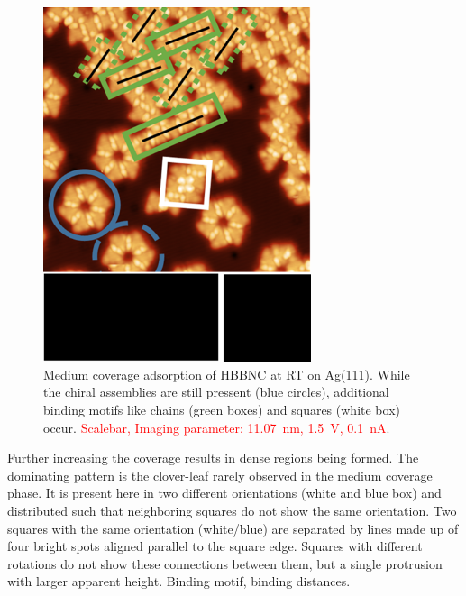 \begin{figure}[] \centering
	\includegraphics[width=0.7\textwidth]{./images/hbbnc-ag-111-rt-med-coverage}
	\caption{Medium coverage adsorption of HBBNC at RT on Ag(111). While the chiral assemblies are still pressent (blue circles), additional binding motifs like chains (green boxes) and squares (white box) occur. \textcolor{red}{Scalebar, Imaging parameter: \SI{11.07}{\nano \meter}, \SI{1.5}{\volt}, \SI{0.1}{\nano \ampere}}.}
	\label{}
\end{figure}

Further increasing the coverage results in dense regions being formed. The dominating pattern is the clover-leaf rarely observed in the medium coverage phase. It is present here in two different orientations (white and blue box) and distributed such that neighboring squares do not show the same orientation. Two squares with the same orientation (white/blue) are separated by lines made up of four bright spots aligned parallel to the square edge. Squares with different rotations do not show these connections between them, but a single protrusion with larger apparent height.
Binding motif, binding distances.

